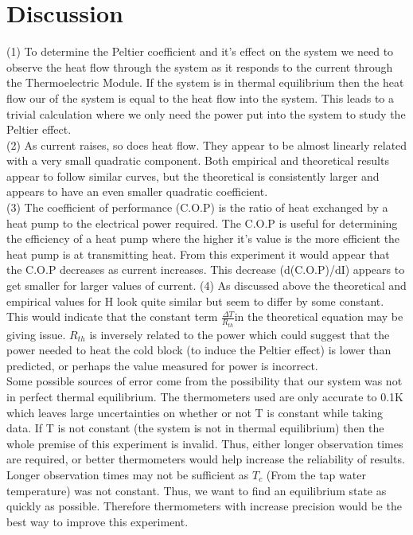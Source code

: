 \documentclass{article}
\begin{document}
\section{Discussion}
(1) To determine the Peltier coefficient and it's effect on the system we need to observe the heat flow through the system as it responds to the current through the Thermoelectric Module. If the system is in thermal equilibrium then the heat flow our of the system is equal to the heat flow into the system. This leads to a trivial calculation where we only need the power put into the system to study the Peltier effect.\\
(2) As current raises, so does heat flow. They appear to be almost linearly related with a very small quadratic component. Both empirical and theoretical results appear to follow similar curves, but the theoretical is consistently larger and appears to have an even smaller quadratic coefficient.\\
(3) The coefficient of performance (C.O.P) is the ratio of heat exchanged by a heat pump to the electrical power required. The C.O.P is useful for determining the efficiency of a heat pump where the higher it's value is the more efficient the heat pump is at transmitting heat. From this experiment it would appear that the C.O.P decreases as current increases. This decrease (d(C.O.P)/dI) appears to get smaller for larger values of current.
(4) As discussed above the theoretical and empirical values for H look quite similar but seem to differ by some constant. This would indicate that the constant term $\frac{\Delta T}{R_{th}}$in the theoretical equation may be giving issue. $R_{th}$ is inversely related to the power which could suggest that the power needed to heat the cold block (to induce the Peltier effect) is lower than predicted, or perhaps the value measured for power is incorrect.\\
Some possible sources of error come from the possibility that our system was not in perfect thermal equilibrium. The thermometers used are only accurate to 0.1K which leaves large uncertainties on whether or not T is constant while taking data. If T is not constant (the system is not in thermal equilibrium) then the whole premise of this experiment is invalid. Thus, either longer observation times are required, or better thermometers would help increase the reliability of results. Longer observation times may not be sufficient as $T_c$ (From the tap water temperature) was not constant. Thus, we want to find an equilibrium state as quickly as possible. Therefore thermometers with increase precision would be the best way to improve this experiment.
\end{document}
